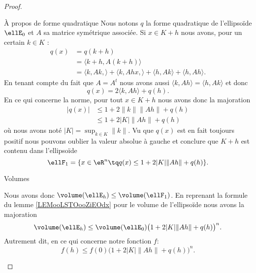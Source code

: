 \begin{proof}
    \begin{subproof}
        \item[À propos de forme quadratique]
            Nous notons \( q\) la forme quadratique de l'ellipsoïde \( \ellE_0\) et \( A\) sa matrice symétrique associée. Si \( x\in K+h\) nous avons, pour un certain \( k\in K\) :
            \begin{subequations}
                \begin{align}
                    q(x)&=q(k+h)\\
                    &=\langle k+h, A(k+h)\rangle \\
                    &=\langle k,Ak, \rangle +\langle k,Ahx, \rangle +\langle h, Ak\rangle +\langle h, Ah\rangle.
                \end{align}
            \end{subequations}
            En tenant compte du fait que \( A=A^t\) nous avons aussi \( \langle k, Ah\rangle =\langle h, Ak\rangle \) et donc
            \begin{equation}
                q(x)=2\langle k, Ah\rangle +q(h).
            \end{equation}
            En ce qui concerne la norme, pour tout \( x\in K+h\) nous avons donc la majoration
            \begin{subequations}
                \begin{align}
                | q(x) |&\leq 1+2\| k \|\| Ah \|+q(h)\\
                &\leq 1+2| K |\| Ah \|+q(h)
                \end{align}
            \end{subequations}
            où nous avons noté \( | K |=\sup_{k\in K}\| k \|\). Vu que \( q(x)\) est en fait toujours positif nous pouvons oublier la valeur absolue à gauche et conclure que \( K+h\) est contenu dans l'ellipsoïde
            \begin{equation}
                \ellF_1=\{ x\in \eR^n\tq q(x)\leq 1+2| K |\| Ah \|+q(h) \}.
            \end{equation}

        \item[Volumes]

            Nous avons donc \( \volume(\ellE_h)\leq \volume(\ellF_1)\). En reprenant la formule du lemme \ref{LEMooLSTOooZiEOdx} pour le volume de l'ellipsoïde nous avons la majoration
            \begin{equation}
                \volume(\ellE_h)\leq \volume(\ellE_0)\big( 1+2| K |\| Ah \|+q(h) \big)^n.
            \end{equation}
            Autrement dit, en ce qui concerne notre fonction \( f\):
            \begin{equation}        \label{EQooLVZCooJVxVNx}
                f(h)\leq f(0)\big( 1+2| K |\| Ah \|+q(h) \big)^n.
            \end{equation}
            

\end{subproof}
\end{proof}
